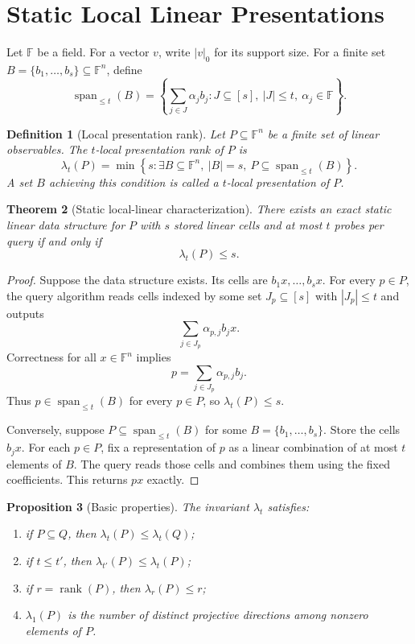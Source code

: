 \documentclass[11pt]{article}
\newtheorem{theorem}{Theorem}[section]
\newtheorem{proposition}[theorem]{Proposition}
\newtheorem{definition}[theorem]{Definition}
\begin{document}
\section{Static Local Linear Presentations}

Let $\mathbb F$ be a field. For a vector $v$, write $|v|_0$ for its support size. For a finite set $B=\{b_1,\ldots,b_s\}\subseteq\mathbb F^n$, define
\[
\operatorname{span}_{\le t}(B)
=
\left\{
\sum_{j\in J}\alpha_j b_j:
J\subseteq [s],\ |J|\le t,\ \alpha_j\in\mathbb F
\right\}.
\]

\begin{definition}[Local presentation rank]
Let $P\subseteq\mathbb F^n$ be a finite set of linear observables. The $t$-local presentation rank of $P$ is
\[
\lambda_t(P)
=
\min\left\{
s:
\exists B\subseteq\mathbb F^n,\ |B|=s,\ P\subseteq \operatorname{span}_{\le t}(B)
\right\}.
\]
A set $B$ achieving this condition is called a $t$-local presentation of $P$.
\end{definition}

\begin{theorem}[Static local-linear characterization]
There exists an exact static linear data structure for $P$ with $s$ stored linear cells and at most $t$ probes per query if and only if
\[
\lambda_t(P)\le s.
\]
\end{theorem}

\begin{proof}
Suppose the data structure exists. Its cells are $b_1x,\ldots,b_sx$. For every $p\in P$, the query algorithm reads cells indexed by some set $J_p\subseteq [s]$ with $|J_p|\le t$ and outputs
\[
\sum_{j\in J_p}\alpha_{p,j} b_jx.
\]
Correctness for all $x\in\mathbb F^n$ implies
\[
p=\sum_{j\in J_p}\alpha_{p,j}b_j.
\]
Thus $p\in \operatorname{span}_{\le t}(B)$ for every $p\in P$, so $\lambda_t(P)\le s$.

Conversely, suppose $P\subseteq \operatorname{span}_{\le t}(B)$ for some $B=\{b_1,\ldots,b_s\}$. Store the cells $b_jx$. For each $p\in P$, fix a representation of $p$ as a linear combination of at most $t$ elements of $B$. The query reads those cells and combines them using the fixed coefficients. This returns $px$ exactly.
\end{proof}

\begin{proposition}[Basic properties]
The invariant $\lambda_t$ satisfies:
\begin{enumerate}
\item if $P\subseteq Q$, then $\lambda_t(P)\le \lambda_t(Q)$;
\item if $t\le t'$, then $\lambda_{t'}(P)\le \lambda_t(P)$;
\item if $r=\operatorname{rank}(P)$, then $\lambda_r(P)\le r$;
\item $\lambda_1(P)$ is the number of distinct projective directions among nonzero elements of $P$.
\end{enumerate}
\end{proposition}
\end{document}

